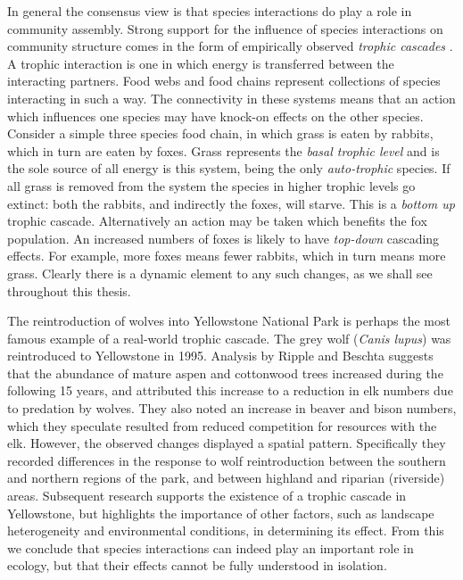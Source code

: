 In general the consensus view is that species interactions do play a role in community assembly. Strong support for the influence of species interactions on community structure comes in the form of empirically observed \emph{trophic cascades} \cite{knight2005trophic,ripple2012trophic}. A trophic interaction is one in which energy is transferred between the interacting partners. Food webs and food chains represent collections of species interacting in such a way. The connectivity in these systems means that an action which influences one species may have knock-on effects on the other species. Consider a simple three species food chain, in which grass is eaten by rabbits, which in turn are eaten by foxes. Grass represents the \emph{basal trophic level} and is the sole source of all energy is this system, being the only \emph{auto-trophic} species. If all grass is removed from the system the species in higher trophic levels go extinct: both the rabbits, and indirectly the foxes, will starve. This is a \emph{bottom up} trophic cascade. Alternatively an action may be taken which benefits the fox population. An increased numbers of foxes is likely to have \emph{top-down} cascading effects. For example, more foxes means fewer rabbits, which in turn means more grass. Clearly there is a dynamic element to any such changes, as we shall see throughout this thesis. 

The reintroduction of wolves into Yellowstone National Park is perhaps the most famous example of a real-world trophic cascade. The grey wolf (\emph{Canis lupus}) was reintroduced to Yellowstone in 1995. Analysis by Ripple and Beschta  \cite{ripple2012trophic} suggests that the abundance of mature aspen and cottonwood trees increased during the following 15 years, and attributed this increase to a reduction in elk numbers due to predation by wolves. They also noted an increase in beaver and bison numbers, which they speculate resulted from reduced competition for resources with the elk. However, the observed changes displayed a spatial pattern. Specifically they recorded differences in the response to wolf reintroduction between the southern and northern regions of the park, and between highland and riparian (riverside) areas. Subsequent research \cite{marshall2014interactions} supports the existence of a trophic cascade in Yellowstone, but highlights the importance of other factors, such as landscape heterogeneity and environmental conditions, in determining its effect. From this we conclude that species interactions can indeed play an important role in ecology, but that their effects cannot be fully understood in isolation.

